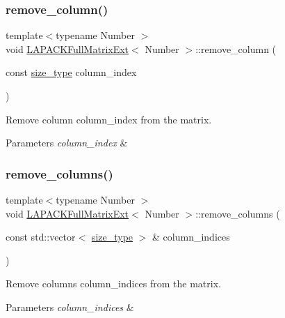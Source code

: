 \subsubsection{\texorpdfstring{remove\+\_\+column()}{remove\_column()}}
{\footnotesize\ttfamily template$<$typename Number $>$ \\
void \hyperlink{classLAPACKFullMatrixExt}{L\+A\+P\+A\+C\+K\+Full\+Matrix\+Ext}$<$ Number $>$\+::remove\+\_\+column (\begin{DoxyParamCaption}\item[{const \hyperlink{classLAPACKFullMatrixExt_a5cf5f4a6104dc17029210b5ca52bf574}{size\+\_\+type}}]{column\+\_\+index }\end{DoxyParamCaption})}

Remove column {\ttfamily column\+\_\+index} from the matrix. 
\begin{DoxyParams}{Parameters}
{\em column\+\_\+index} & \\
\hline
\end{DoxyParams}
\mbox{\label{classLAPACKFullMatrixExt_acf4f82469289156a7d3993def0481152}} 
\subsubsection{\texorpdfstring{remove\+\_\+columns()}{remove\_columns()}}
{\footnotesize\ttfamily template$<$typename Number $>$ \\
void \hyperlink{classLAPACKFullMatrixExt}{L\+A\+P\+A\+C\+K\+Full\+Matrix\+Ext}$<$ Number $>$\+::remove\+\_\+columns (\begin{DoxyParamCaption}\item[{const std\+::vector$<$ \hyperlink{classLAPACKFullMatrixExt_a5cf5f4a6104dc17029210b5ca52bf574}{size\+\_\+type} $>$ \&}]{column\+\_\+indices }\end{DoxyParamCaption})}

Remove columns {\ttfamily column\+\_\+indices} from the matrix. 
\begin{DoxyParams}{Parameters}
{\em column\+\_\+indices} & \\
\hline
\end{DoxyParams}
\mbox{\label{classLAPACKFullMatrixExt_a28fcbdee16b201644ef5c1a7beccfeb6}} 
